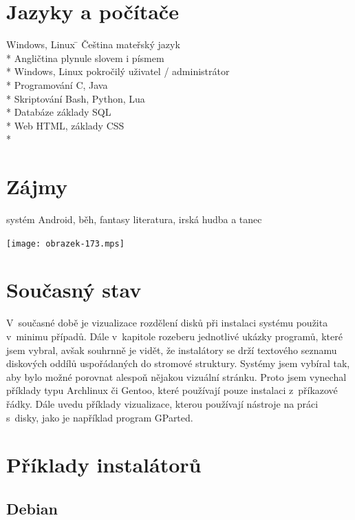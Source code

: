 \documentclass[a4paper]{article}
\begin{document}
\section*{Jazyky a počítače}
\begin{tabbing}
Windows, Linux \=					\kill
Čeština\> mateřský jazyk\\*
Angličtina\> plynule slovem i písmem\\*
Windows, Linux \>pokročilý uživatel / administrátor\\*
Programování\> C, Java\\*
Skriptování\> Bash, Python, Lua\\*
Databáze\> základy SQL\\*
Web\> HTML, základy CSS\\*
\end{tabbing}

\section*{Zájmy}
systém Android, běh, fantasy literatura, irská hudba a tanec

\texttt{[image: obrazek-173.mps]}
\maketitle
\section{Současný stav}

V~současné době je vizualizace rozdělení disků při instalaci systému použita v~minimu případů. Dále v~kapitole rozeberu jednotlivé ukázky programů, které jsem vybral, avšak souhrnně je vidět, 
že instalátory se drží textového seznamu diskových oddílů uspořádaných do stromové struktury. Systémy jsem vybíral tak, aby bylo možné porovnat alespoň nějakou vizuální stránku. Proto jsem vynechal
příklady typu Archlinux či Gentoo, které používají pouze instalaci z~příkazové řádky.  Dále uvedu příklady vizualizace, kterou používají nástroje na práci s~disky, jako je 
například program GParted.

\section{Příklady instalátorů}

\subsection{Debian}
\end{document}
